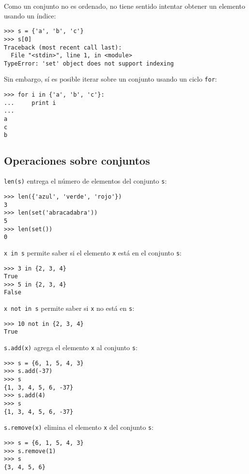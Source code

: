 Como un conjunto no es ordenado, no tiene sentido intentar obtener un
elemento usando un índice:

\begin{lstlisting}
>>> s = {'a', 'b', 'c'}
>>> s[0]
Traceback (most recent call last):
  File "<stdin>", line 1, in <module>
TypeError: 'set' object does not support indexing
\end{lstlisting}

Sin embargo, sí es posible iterar sobre un conjunto usando un ciclo
\lstinline!for!:

\begin{lstlisting}
>>> for i in {'a', 'b', 'c'}:
...     print i
...
a
c
b
\end{lstlisting}

\subsection{Operaciones sobre conjuntos}

\lstinline!len(s)! entrega el número de elementos del conjunto
\lstinline!s!:

\begin{lstlisting}
>>> len({'azul', 'verde', 'rojo'})
3
>>> len(set('abracadabra'))
5
>>> len(set())
0
\end{lstlisting}

\lstinline!x in s! permite saber si el elemento \lstinline!x! está en el
conjunto \lstinline!s!:

\begin{lstlisting}
>>> 3 in {2, 3, 4}
True
>>> 5 in {2, 3, 4}
False
\end{lstlisting}

\lstinline!x not in s! permite saber si \lstinline!x! no está en
\lstinline!s!:

\begin{lstlisting}
>>> 10 not in {2, 3, 4}
True
\end{lstlisting}

\lstinline!s.add(x)! agrega el elemento \lstinline!x! al conjunto
\lstinline!s!:

\begin{lstlisting}
>>> s = {6, 1, 5, 4, 3}
>>> s.add(-37)
>>> s
{1, 3, 4, 5, 6, -37}
>>> s.add(4)
>>> s
{1, 3, 4, 5, 6, -37}
\end{lstlisting}

\lstinline!s.remove(x)! elimina el elemento \lstinline!x! del conjunto
\lstinline!s!:

\begin{lstlisting}
>>> s = {6, 1, 5, 4, 3}
>>> s.remove(1)
>>> s
{3, 4, 5, 6}
\end{lstlisting}

